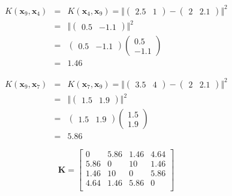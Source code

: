 \documentclass[11pt]{article}
\begin{document}
\begin{enumerate}
\begin{enumerate}
\begin{eqnarray*}
K(\mathbf{x}_9, \mathbf{x}_4) &=& K(\mathbf{x}_4, \mathbf{x}_9) = \Vert (\begin{array}{cc} 2.5 & 1 \end{array}) - (\begin{array}{cc} 2 & 2.1 \end{array}) \Vert^2 \\
&=& \Vert (\begin{array}{cc} 0.5 & -1.1 \end{array}) \Vert^2 \\
&=& (\begin{array}{cc} 0.5 & -1.1 \end{array}) \left(\begin{array}{c} 0.5 \\ -1.1 \end{array}\right) \\
&=& 1.46
\end{eqnarray*}

\begin{eqnarray*}
K(\mathbf{x}_9, \mathbf{x}_7) &=& K(\mathbf{x}_7, \mathbf{x}_9) = \Vert (\begin{array}{cc} 3.5 & 4 \end{array}) - (\begin{array}{cc} 2 & 2.1 \end{array}) \Vert^2 \\
&=& \Vert (\begin{array}{cc} 1.5 & 1.9 \end{array}) \Vert^2 \\
&=& (\begin{array}{cc} 1.5 & 1.9 \end{array}) \left(\begin{array}{c} 1.5 \\ 1.9 \end{array}\right) \\
&=& 5.86
\end{eqnarray*}

\begin{equation}
\mathbf{K} =
\left[\begin{array}{rrrr}
0	&	5.86	&	1.46	&	4.64 \\
5.86	&	0	&	10	&	1.46 \\
1.46	&	10	&	0	&	5.86 \\
4.64	&	1.46	&	5.86	&	0 \\
\end{array}\right]
\end{equation}


\end{enumerate}
\end{enumerate}
\end{document}
